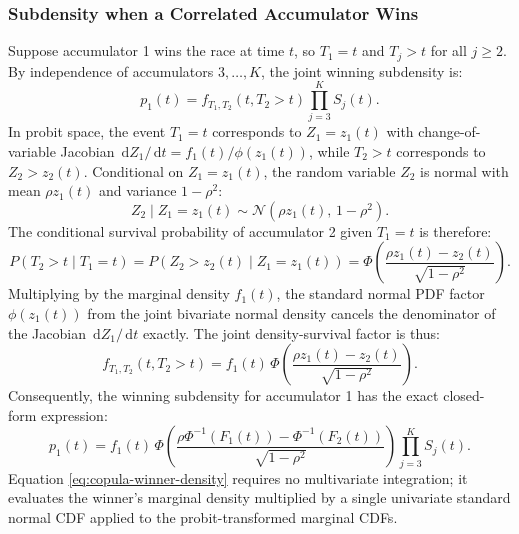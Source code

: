 \documentclass[12pt]{article}
\newcommand{\dd}{\,\mathrm{d}}
\newcommand{\Normal}{\mathcal{N}}
\newcommand{\PhiN}{\Phi}
\newcommand{\phiN}{\phi}
\begin{document}
\subsubsection{Subdensity when a Correlated Accumulator Wins}
Suppose accumulator 1 wins the race at time $t$, so $T_1 = t$ and $T_j > t$ for all $j \ge 2$. By independence of accumulators $3, \dots, K$, the joint winning subdensity is:
\begin{equation}
  p_1(t) = f_{T_1, T_2}(t, T_2 > t) \prod_{j=3}^K S_j(t).
\end{equation}
In probit space, the event $T_1 = t$ corresponds to $Z_1 = z_1(t)$ with change-of-variable Jacobian $\dd Z_1 / \dd t = f_1(t) / \phiN(z_1(t))$, while $T_2 > t$ corresponds to $Z_2 > z_2(t)$. Conditional on $Z_1 = z_1(t)$, the random variable $Z_2$ is normal with mean $\rho z_1(t)$ and variance $1 - \rho^2$:
\begin{equation}
  Z_2 \mid Z_1 = z_1(t) \sim \Normal\left(\rho z_1(t),\, 1 - \rho^2\right).
\end{equation}
The conditional survival probability of accumulator 2 given $T_1 = t$ is therefore:
\begin{equation}
  P(T_2 > t \mid T_1 = t) = P(Z_2 > z_2(t) \mid Z_1 = z_1(t)) = \PhiN\!\left(\frac{\rho z_1(t) - z_2(t)}{\sqrt{1 - \rho^2}}\right).
\end{equation}
Multiplying by the marginal density $f_1(t)$, the standard normal PDF factor $\phiN(z_1(t))$ from the joint bivariate normal density cancels the denominator of the Jacobian $\dd Z_1 / \dd t$ exactly. The joint density-survival factor is thus:
\begin{equation}
  f_{T_1, T_2}(t, T_2 > t) = f_1(t) \, \PhiN\!\left(\frac{\rho z_1(t) - z_2(t)}{\sqrt{1 - \rho^2}}\right).
\end{equation}
Consequently, the winning subdensity for accumulator 1 has the exact closed-form expression:
\begin{equation}
  p_1(t) = f_1(t) \, \PhiN\!\left(\frac{\rho \PhiN^{-1}(F_1(t)) - \PhiN^{-1}(F_2(t))}{\sqrt{1 - \rho^2}}\right) \prod_{j=3}^K S_j(t).
  \label{eq:copula-winner-density}
\end{equation}
Equation \eqref{eq:copula-winner-density} requires no multivariate integration; it evaluates the winner's marginal density multiplied by a single univariate standard normal CDF applied to the probit-transformed marginal CDFs.
\end{document}
